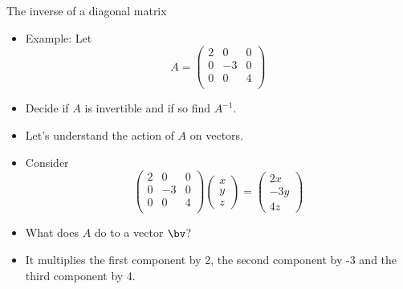\documentclass{beamer}
\begin{document}
\begin{frame}{The inverse of a diagonal matrix}

\begin{itemize}
\item Example: Let
$$
A =
\begin{pmatrix}
2 & 0 & 0 \\
0 & -3 & 0 \\
0 & 0 & 4 \\
\end{pmatrix}
$$
\item Decide if $A$ is invertible and if so find $A^{-1}$.
\item Let's understand the action of $A$ on vectors.
\item Consider
$$
\begin{pmatrix}
2 & 0 & 0 \\
0 & -3 & 0 \\
0 & 0 & 4 \\
\end{pmatrix}
\begin{pmatrix}
x \\ y \\ z
\end{pmatrix}
=
\begin{pmatrix}
2x \\ -3y \\ 4z
\end{pmatrix}
$$
\item What does $A$ do to a vector $\bv$?
\item It multiplies the first component by 2, the second component by -3
and the third component by 4.
\end{itemize}
\end{frame}
\end{document}
